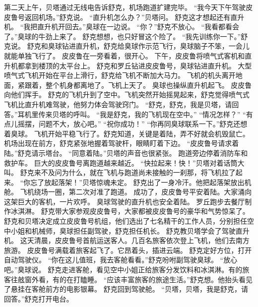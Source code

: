 \documentclass[a4paper,12pt,UTF8,twoside]{ctexbook}
\begin{document}
        第二天上午，贝塔通过无线电告诉舒克，机场跑道扩建完毕。 
        “我今天下午驾驶皮皮鲁号返回机场。”舒克说。 
        “直升机怎么办？”贝塔问。 
        舒克这才想起还有直升机。 
        “我把直升机开回去。”臭球在一边说。 
        “你？”舒克不放心。 
        “我看都看会了。”臭球的牛劲上来了。 
        舒克想想，也只好冒这个险了。 
        “我先训练你一下。”舒克说。 
        舒克和臭球钻进直升机，舒克给臭球作示范飞行，臭球脑子不笨，一会儿就能单独飞行了。 
        皮皮鲁在一旁看着，很开心。 
        下午，皮皮鲁将喷气式客机和直升机都拿到楼顶的太平台上。 
        舒克和罗丘钻进皮皮鲁号，臭球钻进直升机。 
        大型喷气式飞机开始在平台上滑行，舒克给飞机不断加大马力。 
        飞机的机头离开地面，紧跟着，整个机身都离地了。飞机上天了。 
        臭球也操纵直升机起飞。 
        皮皮鲁向他们挥手。 
        舒克的飞机升到了空中。飞机突然开始摇晃起来，舒克觉得喷气式飞机比直升机难驾驶，他努力体会驾驶窍门。 
        “舒克，舒克，我是贝塔，请回答。”耳机里传来贝塔的呼叫。 
        “我是舒克，我的飞机现在空中。” 
        “情况怎样？” 
        “有点儿摇摆，问题不大，放心吧。” 
        “祝你成功！” 
        “你再同臭球联系一下。”舒克还想着臭球。 
        飞机开始平稳飞行了。舒克知道，关键是着陆，弄不好就会机毁鼠亡。 
        机场出现在前方，舒克紧张地握着驾驶杆，眼睛盯着下边。 
        “皮皮鲁号请求着陆。”舒克请示塔台。 
        “同意着陆。”贝塔的声音也很紧张。 
        跑道旁边停着消防车和救护车。 
        巨大的皮皮鲁号离跑道越来越近。 
        “快拉起来！快！”贝塔对着话筒大叫。 
        舒克来不及问为什么，就在飞机与跑道尚未接触的一刹那，将飞机拉了起来。 
        “你忘了放起落架！”贝塔惊魂未定。 
        舒克出了一身冷汗。他把起落架放出机舱。 
        飞机绕场一圈，第二次对准了跑道。 
        成功了，皮皮鲁号平安着陆。大家涌向这架巨大的客机，一片欢呼。 
        臭球驾驶的直升机也安全着陆。 
        罗丘跑步去餐厅制作冰淇淋。 
        舒克带大家参观皮皮鲁号，大家都被皮皮鲁号的豪华和气势惊呆了。 
        舒克和贝塔决定成立皮皮鲁号机组，他们选出了七名精干的工作人员，分别担任空中小姐和机械师，臭球担任副驾驶，舒克担任机长。 
        舒克教贝塔学会了驾驶直升机。 
        这天清晨，皮皮鲁号首航运送客人。几百名旅客依次登上飞机，他们去南方旅游。 
        皮皮鲁号满载着旅客起飞了。它昂着头，插进云端。 
        舒克定好方位，打开自动驾驶仪。 
        “你在这儿值班，我去客舱看看。”舒克吩咐副驾驶臭球。 
        “放心吧。”臭球说。 
        舒克走进客舱，看见空中小姐正给旅客分发饮料和冰淇淋。有的旅客往舷窗外看，有的在打瞌睡。 
        “应该丰富旅客的旅途生活。”舒克想。他抬头看见了悬挂在客舱前方的电影银幕。 
        舒克回到驾驶舱。 
        “贝塔，贝塔，我是舒克，请回答。”舒克打开电台。 
\end{document}
